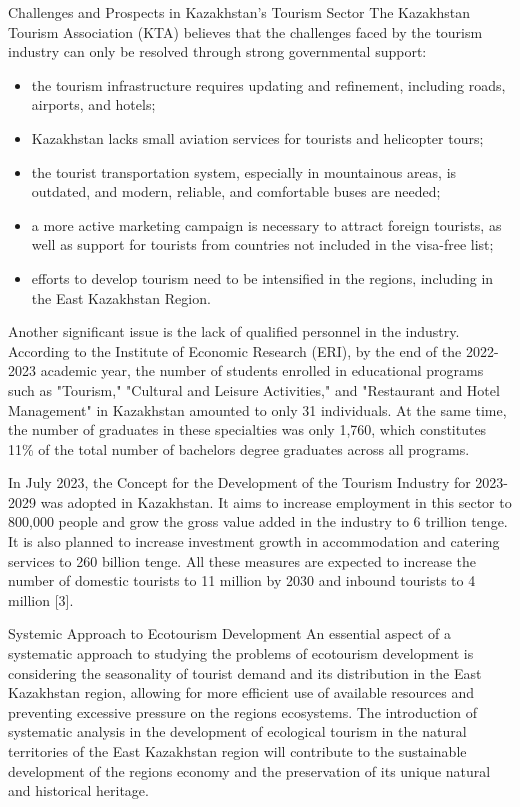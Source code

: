 Challenges and Prospects in Kazakhstan's Tourism Sector The Kazakhstan
Tourism Association (KTA) believes that the challenges faced by the
tourism industry can only be resolved through strong governmental
support:

\begin{itemize}
\item
  the tourism infrastructure requires updating and refinement, including
  roads, airports, and hotels;
\item
  Kazakhstan lacks small aviation services for tourists and helicopter
  tours;
\item
  the tourist transportation system, especially in mountainous areas, is
  outdated, and modern, reliable, and comfortable buses are needed;
\item
  a more active marketing campaign is necessary to attract foreign
  tourists, as well as support for tourists from countries not included
  in the visa-free list;
\item
  efforts to develop tourism need to be intensified in the regions,
  including in the East Kazakhstan Region.
\end{itemize}

Another significant issue is the lack of qualified personnel in the
industry. According to the Institute of Economic Research (ERI), by the
end of the 2022-2023 academic year, the number of students enrolled in
educational programs such as "Tourism," "Cultural and Leisure
Activities," and "Restaurant and Hotel Management" in Kazakhstan
amounted to only 31 individuals. At the same time, the number of
graduates in these specialties was only 1,760, which constitutes 11\% of
the total number of bachelor\textquotesingle s degree graduates across
all programs.

In July 2023, the Concept for the Development of the Tourism Industry
for 2023-2029 was adopted in Kazakhstan. It aims to increase employment
in this sector to 800,000 people and grow the gross value added in the
industry to 6 trillion tenge. It is also planned to increase investment
growth in accommodation and catering services to 260 billion tenge. All
these measures are expected to increase the number of domestic tourists
to 11 million by 2030 and inbound tourists to 4 million {[}3{]}.

Systemic Approach to Ecotourism Development An essential aspect of a
systematic approach to studying the problems of ecotourism development
is considering the seasonality of tourist demand and its distribution in
the East Kazakhstan region, allowing for more efficient use of available
resources and preventing excessive pressure on the
region\textquotesingle s ecosystems. The introduction of systematic
analysis in the development of ecological tourism in the natural
territories of the East Kazakhstan region will contribute to the
sustainable development of the region\textquotesingle s economy and the
preservation of its unique natural and historical heritage.

